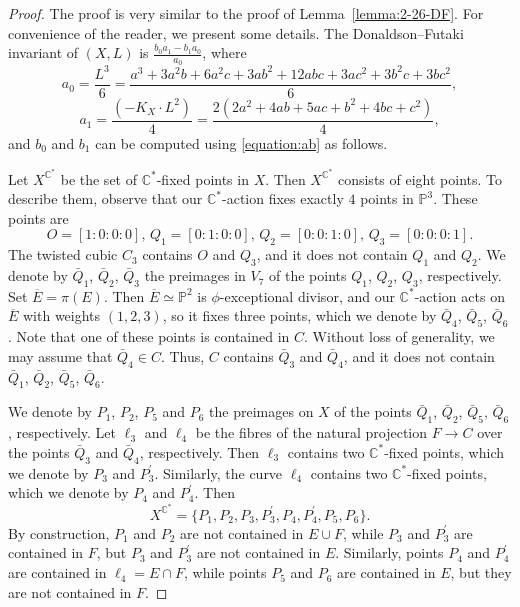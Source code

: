 \documentclass[12pt]{amsart}
\theoremstyle{definition}
\theoremstyle{remark}
\newcommand{\C}{\mathbb{C}}
\begin{document}
\begin{proof}
The proof is very similar to  the proof of Lemma~\ref{lemma:2-26-DF}. For convenience of the reader, we present some details.
The Donaldson--Futaki invariant of $(X,L)$ is $\frac{b_0a_1-b_1a_0}{a_0}$, where
$$
a_0=\frac{L^3}{6}=\frac{a^3+3a^2b+6a^2c+3ab^2+12abc+3ac^2+3b^2c+3bc^2}{6},
$$
$$
a_1=\frac{(-K_X\cdot L^2)}{4}=\frac{2(2a^2+4ab+5ac+b^2+4bc+c^2)}{4},
$$
and $b_0$ and $b_1$ can be computed using  \eqref{equation:ab} as follows.

Let $X^{\C^*}$ be the set of $\mathbb{C}^*$-fixed points in $X$.
Then $X^{\C^*}$ consists of eight points.
To describe them, observe that our $\mathbb{C}^*$-action fixes exactly $4$ points in $\mathbb{P}^3$. These points are
$$
O=[1:0:0:0],\,
Q_1=[0:1:0:0],\,
Q_2=[0:0:1:0],\,
Q_3=[0:0:0:1].
$$
The twisted cubic $C_3$ contains $O$ and $Q_3$, and it does not contain $Q_1$ and $Q_2$.
We denote by $\bar{Q}_1$, $\bar{Q}_2$, $\bar{Q}_3$ the preimages in $V_7$ of the points $Q_1$, $Q_2$, $Q_3$, respectively.
Set $\overline{E}=\pi(E)$. Then $\overline{E}\simeq\mathbb{P}^2$ is $\phi$-exceptional divisor,
and our $\C^*$-action acts on $\overline{E}$ with weights $(1,2,3)$, so it fixes three points,
which we denote by $\bar{Q}_4$, $\bar{Q}_5$, $\bar{Q}_6$.
Note that one of these points is contained in $C$. Without loss of generality, we may assume that $\bar{Q}_4\in C$.
Thus, $C$ contains $\bar{Q}_3$ and $\bar{Q}_4$, and it does not contain  $\bar{Q}_1$, $\bar{Q}_2$, $\bar{Q}_5$, $\bar{Q}_6$.

We denote by $P_1$, $P_2$, $P_5$ and $P_6$ the preimages on $X$ of the points $\bar{Q}_1$, $\bar{Q}_2$, $\bar{Q}_5$, $\bar{Q}_6$, respectively.
Let $\ell_3$ and $\ell_4$ be the fibres of the natural projection $F\to C$ over the points $\bar{Q}_3$ and $\bar{Q}_4$, respectively.
Then $\ell_3$ contains two $\mathbb{C}^*$-fixed points, which we denote by $P_3$ and $P_3^\prime$.
Similarly, the curve $\ell_4$ contains two $\mathbb{C}^*$-fixed points, which we denote by $P_4$ and $P_4^\prime$.
Then
$$
X^{\C^*}=\big\{P_1,P_2,P_3,P_3^\prime,P_4,P_4^\prime,P_5,P_6\big\}.
$$
By construction, $P_1$ and $P_2$ are not contained in $E\cup F$, while  $P_3$ and $P_3^\prime$ are contained in $F$,
but $P_3$ and $P_3^\prime$ are not contained in $E$.
Similarly, points $P_4$ and $P_4^\prime$ are contained in $\ell_4=E\cap F$, while points $P_5$ and $P_6$ are contained in $E$,
but they are not contained in $F$.


\end{proof}
\end{document}
